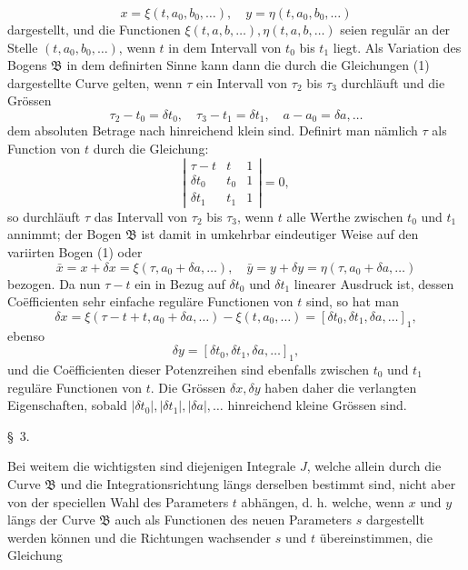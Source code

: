 \documentclass[11pt,a4paper,leqno]{article}
\begin{document}
\[
 x=\xi(t,a_0,b_0,\ldots),\quad y=\eta(t,a_0,b_0,\ldots)
\]
dargestellt, und die Functionen $\xi(t,a,b,\ldots),\eta(t,a,b,\ldots)$ seien regulär an der Stelle $(t,a_0,b_0,\ldots)$, wenn $t$ in dem Intervall von $t_0$ bis $t_1$ liegt. Als Variation des Bogens $\mathfrak{B}$ in dem definirten Sinne kann dann die durch die Gleichungen (1) dargestellte Curve gelten, wenn $\tau$ ein Intervall von $\tau_2$ bis $\tau_3$ durchläuft und die Grössen
\[
 \tau_2-t_0=\delta t_0,\quad \tau_3-t_1=\delta t_1,\quad a-a_0=\delta a,\ldots
\]
dem absoluten Betrage nach hinreichend klein sind. Definirt man nämlich $\tau$ als Function von $t$ durch die Gleichung:
\[
 \left|\begin{array}{ccc}
 \tau-t & t & 1\\
 \delta t_0 & t_0 & 1\\
 \delta t_1 & t_1 & 1
 \end{array}\right|=0,
\]
so durchläuft $\tau$ das Intervall von $\tau_2$ bis $\tau_3$, wenn $t$ alle Werthe zwischen $t_0$ und $t_1$ annimmt; der Bogen $\mathfrak{B}$ ist damit in umkehrbar eindeutiger Weise auf den variirten Bogen (1) oder
\[
 \bar{x}=x+\delta x=\xi(\tau,a_0+\delta a,\ldots),\quad
 \bar{y}=y+\delta y=\eta(\tau,a_0+\delta a,\ldots)
\]
bezogen. Da nun $\tau-t$ ein in Bezug auf $\delta t_0$ und $\delta t_1$ linearer Ausdruck ist, dessen Coëfficienten sehr einfache reguläre Functionen von $t$ sind, so hat man
\[
 \delta x=\xi(\tau-t+t,a_0+\delta a,\ldots)-\xi(t,a_0,\ldots)=[\delta t_0,\delta t_1,\delta a,\ldots]_1,
\]
ebenso
\[
 \delta y=[\delta t_0,\delta t_1,\delta a,\ldots]_1,
\]
und die Coëfficienten dieser Potenzreihen sind ebenfalls zwischen $t_0$ und $t_1$ reguläre Functionen von $t$. Die Grössen $\delta x,\delta y$ haben daher die verlangten Eigenschaften, sobald $|\delta t_0|,|\delta t_1|,|\delta a|,\ldots$ hinreichend kleine Grössen sind.

\begin{center}{\large \S~3.}\end{center}

Bei weitem die wichtigsten sind diejenigen Integrale $J$, welche allein durch die Curve $\mathfrak{B}$ und die Integrationsrichtung längs derselben bestimmt sind, nicht aber von der speciellen Wahl des Parameters $t$ abhängen, d. h. welche, wenn $x$ und $y$ längs der Curve $\mathfrak{B}$ auch als Functionen des neuen Parameters $s$ dargestellt werden können und die Richtungen wachsender $s$ und $t$ übereinstimmen, die Gleichung
\end{document}
